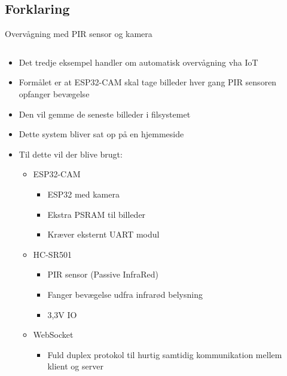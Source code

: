 \documentclass[aspectratio=169]{beamer}
\begin{document}
\subsection{Forklaring}
\begin{frame}{Overvågning med PIR sensor og kamera}
\begin{columns}
	\begin{column}{0.6\textwidth}
		\begin{textBox}
			\begin{itemize}
				\item Det tredje eksempel handler om automatisk overvågning vha IoT
				\item Formålet er at ESP32-CAM skal tage billeder hver gang PIR sensoren opfanger bevægelse
				\item Den vil gemme de seneste billeder i filsystemet
				\item Dette system bliver sat op på en hjemmeside
				\item Til dette vil der blive brugt:
				\begin{itemize}
					\item ESP32-CAM
					\begin{itemize}
						\item ESP32 med kamera
						\item Ekstra PSRAM til billeder
						\item Kræver eksternt UART modul
					\end{itemize}
					\item HC-SR501
					\begin{itemize}
						\item PIR sensor (Passive InfraRed)
						\item Fanger bevægelse udfra infrarød belysning
						\item 3,3V IO
					\end{itemize}
					\item WebSocket 
					\begin{itemize}
						\item Fuld duplex protokol til hurtig samtidig kommunikation mellem klient og server
					\end{itemize}
				\end{itemize}
			\end{itemize}
		\end{textBox}
	\end{column}
	\begin{column}{0.4\textwidth}
		\centering
		\captionsetup{format=tcbcaptionsmall}
		\begin{columns}

\end{columns}
\end{column}
\end{columns}
\end{frame}
\end{document}

